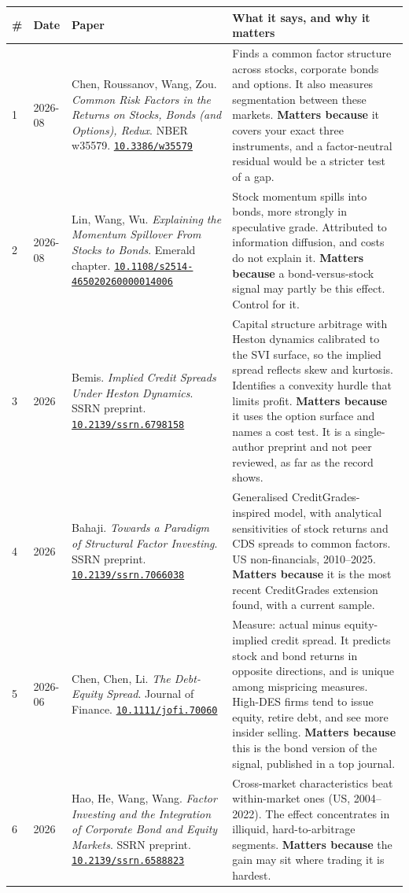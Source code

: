 \documentclass[10pt,a4paper]{article}
\newcommand{\doi}[1]{\href{https://doi.org/#1}{\nolinkurl{#1}}}
\begin{document}
{\small
\begin{longtable}{@{}P{0.5cm}P{1.3cm}P{5.6cm}P{9.2cm}@{}}
\toprule
\# & Date & Paper & What it says, and why it matters \\
\midrule
{} & 2026-08 & Chen, Roussanov, Wang, Zou. \emph{Common Risk Factors in the Returns on Stocks, Bonds (and Options), Redux}. NBER w35579. \doi{10.3386/w35579} & Finds a common factor structure across stocks, corporate bonds and options. It also measures segmentation between these markets. \textbf{Matters because} it covers your exact three instruments, and a factor-neutral residual would be a stricter test of a gap. \\
2 & 2026-08 & Lin, Wang, Wu. \emph{Explaining the Momentum Spillover From Stocks to Bonds}. Emerald chapter. \doi{10.1108/s2514-465020260000014006} & Stock momentum spills into bonds, more strongly in speculative grade. Attributed to information diffusion, and costs do not explain it. \textbf{Matters because} a bond-versus-stock signal may partly be this effect. Control for it. \\
3 & 2026 & Bemis. \emph{Implied Credit Spreads Under Heston Dynamics}. SSRN preprint. \doi{10.2139/ssrn.6798158} & Capital structure arbitrage with Heston dynamics calibrated to the SVI surface, so the implied spread reflects skew and kurtosis. Identifies a convexity hurdle that limits profit. \textbf{Matters because} it uses the option surface and names a cost test. It is a single-author preprint and not peer reviewed, as far as the record shows. \\
4 & 2026 & Bahaji. \emph{Towards a Paradigm of Structural Factor Investing}. SSRN preprint. \doi{10.2139/ssrn.7066038} & Generalised CreditGrades-inspired model, with analytical sensitivities of stock returns and CDS spreads to common factors. US non-financials, 2010--2025. \textbf{Matters because} it is the most recent CreditGrades extension found, with a current sample. \\
5 & 2026-06 & Chen, Chen, Li. \emph{The Debt-Equity Spread}. Journal of Finance. \doi{10.1111/jofi.70060} & Measure: actual minus equity-implied credit spread. It predicts stock and bond returns in opposite directions, and is unique among mispricing measures. High-DES firms tend to issue equity, retire debt, and see more insider selling. \textbf{Matters because} this is the bond version of the signal, published in a top journal. \\
6 & 2026 & Hao, He, Wang, Wang. \emph{Factor Investing and the Integration of Corporate Bond and Equity Markets}. SSRN preprint. \doi{10.2139/ssrn.6588823} & Cross-market characteristics beat within-market ones (US, 2004--2022). The effect concentrates in illiquid, hard-to-arbitrage segments. \textbf{Matters because} the gain may sit where trading it is hardest. \\

\end{longtable}}
\end{document}
